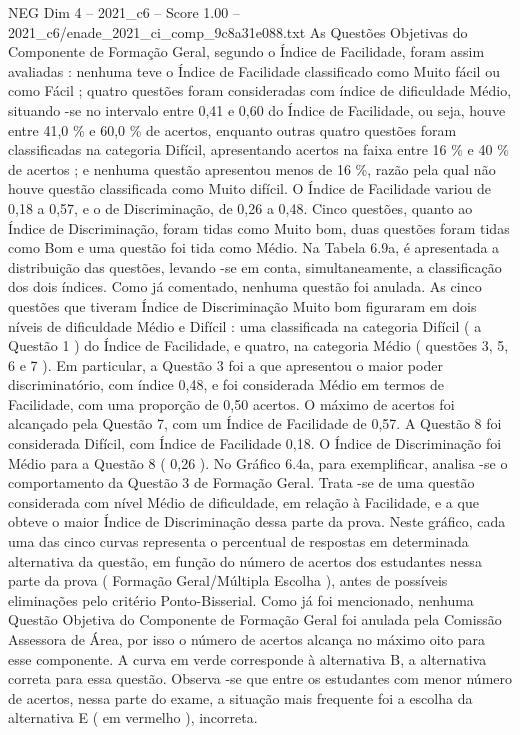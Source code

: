\begin{textsample}{NEG Dim 4 – 2021\_c6 – Score 1.00 – 2021\_c6/enade\_2021\_ci\_comp\_9c8a31e088.txt}
As Questões Objetivas do Componente de Formação Geral, segundo o Índice de Facilidade, foram assim avaliadas : nenhuma teve o Índice de Facilidade classificado como Muito fácil ou como Fácil ; quatro questões foram consideradas com índice de dificuldade Médio, situando -se no intervalo entre 0,41 e 0,60 do Índice de Facilidade, ou seja, houve entre 41,0 \% e 60,0 \% de acertos, enquanto outras quatro questões foram classificadas na categoria Difícil, apresentando acertos na faixa entre 16 \% e 40 \% de acertos ; e nenhuma questão apresentou menos de 16 \%, razão pela qual não houve questão classificada como Muito difícil.
O Índice de Facilidade variou de 0,18 a 0,57, e o de Discriminação, de 0,26 a 0,48.
Cinco questões, quanto ao Índice de Discriminação, foram tidas como Muito bom, duas questões foram tidas como Bom e uma questão foi tida como Médio.
Na Tabela 6.9a, é apresentada a distribuição das questões, levando -se em conta, simultaneamente, a classificação dos dois índices.
Como já comentado, nenhuma questão foi anulada.
As cinco questões que tiveram Índice de Discriminação Muito bom figuraram em dois níveis de dificuldade Médio e Difícil : uma classificada na categoria Difícil ( a Questão 1 ) do Índice de Facilidade, e quatro, na categoria Médio ( questões 3, 5, 6 e 7 ).
Em particular, a Questão 3 foi a que apresentou o maior poder discriminatório, com índice 0,48, e foi considerada Médio em termos de Facilidade, com uma proporção de 0,50 acertos.
O máximo de acertos foi alcançado pela Questão 7, com um Índice de Facilidade de 0,57.
A Questão 8 foi considerada Difícil, com Índice de Facilidade 0,18.
O Índice de Discriminação foi Médio para a Questão 8 ( 0,26 ).
No Gráfico 6.4a, para exemplificar, analisa -se o comportamento da Questão 3 de Formação Geral.
Trata -se de uma questão considerada com nível Médio de dificuldade, em relação à Facilidade, e a que obteve o maior Índice de Discriminação dessa parte da prova.
Neste gráfico, cada uma das cinco curvas representa o percentual de respostas em determinada alternativa da questão, em função do número de acertos dos estudantes nessa parte da prova ( Formação Geral/Múltipla Escolha ), antes de possíveis eliminações pelo critério Ponto-Bisserial.
Como já foi mencionado, nenhuma Questão Objetiva do Componente de Formação Geral foi anulada pela Comissão Assessora de Área, por isso o número de acertos alcança no máximo oito para esse componente.
A curva em verde corresponde à alternativa B, a alternativa correta para essa questão.
Observa -se que entre os estudantes com menor número de acertos, nessa parte do exame, a situação mais frequente foi a escolha da alternativa E ( em vermelho ), incorreta.

\end{textsample}
